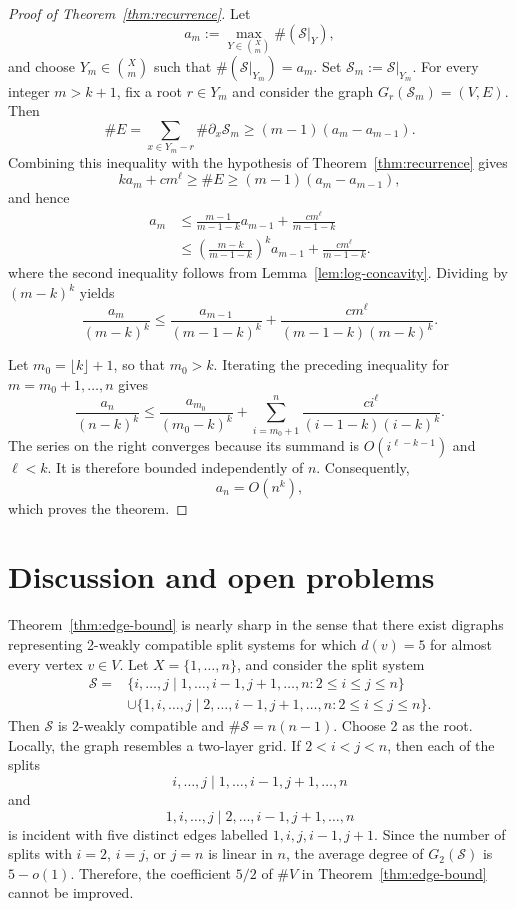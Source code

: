 \documentclass[11pt]{article}
\newcommand{\cS}{\mathcal{S}}
\begin{document}
	\begin{proof}[Proof of Theorem~\ref{thm:recurrence}]
		Let
		\[
		a_m:=\max_{Y\in\binom{X}{m}}\#(\cS|_Y),
		\]
		and choose $Y_m\in\binom{X}{m}$ such that $\#(\cS|_{Y_m})=a_m$. Set $\cS_m:=\cS|_{Y_m}$. For every integer $m>k+1$, fix a root $r\in Y_m$ and consider the graph $G_r(\cS_m)=(V,E)$. Then
		\[
		\#E=\sum_{x\in Y_m-r}\#\partial_x\cS_m
		\ge (m-1)(a_m-a_{m-1}).
		\]
		Combining this inequality with the hypothesis of Theorem~\ref{thm:recurrence} gives
		\[
		ka_m+cm^{\ell}\ge \#E\ge (m-1)(a_m-a_{m-1}),
		\]
		and hence
		\begin{align}
			a_m
			&\le \frac{m-1}{m-1-k}a_{m-1}+\frac{cm^{\ell}}{m-1-k} \label{eq:recurrence-first}\\
			&\le \left(\frac{m-k}{m-1-k}\right)^k a_{m-1}+\frac{cm^{\ell}}{m-1-k}. \label{eq:recurrence-second}
		\end{align}
		where the second inequality follows from Lemma~\ref{lem:log-concavity}. Dividing by $(m-k)^k$ yields
		\begin{equation}\label{eq:normalized-recurrence}
			\frac{a_m}{(m-k)^k}
			\le
			\frac{a_{m-1}}{(m-1-k)^k}
			+
			\frac{cm^{\ell}}{(m-1-k)(m-k)^k}.
		\end{equation}
		
		Let $m_0=\lfloor k\rfloor+1$, so that $m_0>k$. Iterating the preceding inequality for $m=m_0+1,\ldots,n$ gives
		\begin{equation}\label{eq:iterated-recurrence}
			\frac{a_n}{(n-k)^k}
			\le
			\frac{a_{m_0}}{(m_0-k)^k}
			+
			\sum_{i=m_0+1}^{n}
			\frac{ci^{\ell}}{(i-1-k)(i-k)^k}.
		\end{equation}
		The series on the right converges because its summand is $O(i^{\ell-k-1})$ and $\ell<k$. It is therefore bounded independently of $n$. Consequently,
		\[
		a_n=O(n^k),
		\]
		which proves the theorem.
	\end{proof}
	
	\section{Discussion and open problems}
	
	Theorem~\ref{thm:edge-bound} is nearly sharp in the sense that there exist digraphs representing 2-weakly compatible split systems for which $d(v)=5$ for almost every vertex $v\in V$. Let $X=\{1,\ldots,n\}$, and consider the split system
	\begin{align*}
		\cS={}&\{i,\ldots,j\mid 1,\ldots,i-1,j+1,\ldots,n:2\le i\le j\le n\}\\
		&\cup\{1,i,\ldots,j\mid 2,\ldots,i-1,j+1,\ldots,n:2\le i\le j\le n\}.
	\end{align*}
	Then $\cS$ is 2-weakly compatible and $\#\cS=n(n-1)$. Choose 2 as the root. Locally, the graph resembles a two-layer grid. If $2<i<j<n$, then each of the splits
	\[
	i,\ldots,j\mid 1,\ldots,i-1,j+1,\ldots,n
	\]
	and
	\[
	1,i,\ldots,j\mid 2,\ldots,i-1,j+1,\ldots,n
	\]
	is incident with five distinct edges labelled $1,i,j,i-1,j+1$. Since the number of splits with $i=2$, $i=j$, or $j=n$ is linear in $n$, the average degree of $G_2(\cS)$ is $5-o(1)$. Therefore, the coefficient $5/2$ of $\#V$ in Theorem~\ref{thm:edge-bound} cannot be improved.
	
\end{document}
